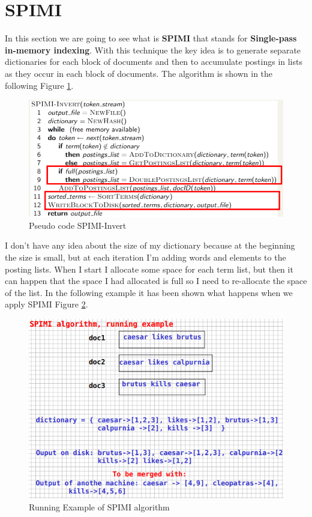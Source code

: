 \section{SPIMI}
In this section we are going to see what is \textbf{SPIMI} that stands for \textbf{Single-pass in-memory indexing}. With this technique the key idea is to generate separate dictionaries for each block of documents and then to accumulate postings in lists as they occur in each block of documents.\newline
The algorithm is shown in the following Figure \ref{fig:spiminvert}.
\begin{figure}
    \centering
    \includegraphics[width=0.75\linewidth]{images/spimiinvert.png}
    \caption{Pseudo code SPIMI-Invert}
    \label{fig:spiminvert}
\end{figure}
I don't have any idea about the size of my dictionary because at the beginning the size is small, but at each iteration I'm adding words and elements to the posting lists. When I start I allocate some space for each term list, but then it can happen that the space I had allocated is full so I need to re-allocate the space of the list.\newline
In the following example it has been shown what happens when we apply SPIMI Figure \ref{fig:spimiex}.
\begin{figure}
    \centering
    \includegraphics[width=0.75\linewidth]{images/spimiexample.png}
    \caption{Running Example of SPIMI algorithm}
    \label{fig:spimiex}
\end{figure}
